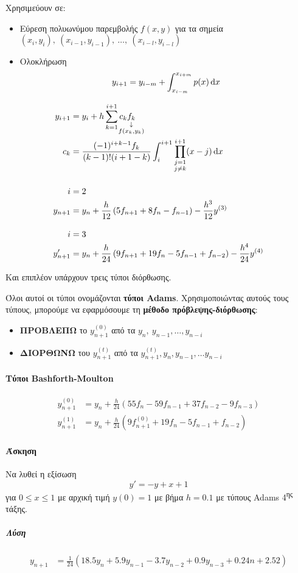 \documentclass[11pt,a4paper,notitlepage,fleqn,final]{article}
\begin{document}
Χρησιμεύουν σε:
\begin{itemize}
	\item Εύρεση πολυωνύμου παρεμβολής \(
	f(x,y)
	 \) για τα σημεία \( (x_i,y_i),\ (x_{i-1},y_{i-1}),\ \dots,\
	 (x_{i-l},y_{i-l})
	  \)
	\item Ολοκλήρωση
	\[
	y_{i+1} = y_{i-m} + \int_{x_{i-m}}^{x_{i+m}} p(x)\mathop{}\!\mathrm{d} x
	\]
\end{itemize}

\begin{align*}
	y_{i+1} &= y_i +h\sum_{k=1}^{i+1} c_k
	\underset{\substack{\downarrow\\ \mathclap{f(x_k,y_k)}}}{f_k} \\
	c_k &= \frac{(-1)^{i+k-1}f_k}{(k-1)!(i+1-k)}
	\int_{i}^{i+1} \prod_{\substack{j=1\\j\neq k}}^{i+1}
	(x-j)\dif x \\[3ex]
	i &= 2\\
	y_{n+1} &=
	y_n + \frac{h}{12}\left(5f_{n+1}+8f_n-f_{n-1}\right)
	-\frac{h^3}{12}y^{(3)} \\[2ex]
	i &= 3\\
	y_{n+1}' &= y_n+\frac{h}{24}\left(
	9f_{n+1}+19f_n-5f_{n-1}+f_{n-2}
	\right) -\frac{h^4}{24}y^{(4)}
\end{align*}

Και επιπλέον υπάρχουν τρεις τύποι διόρθωσης.

Όλοι αυτοί οι τύποι ονομάζονται \textbf{τύποι Adams}. Χρησιμοποιώντας
αυτούς τους τύπους, μπορούμε να εφαρμόσουμε τη \textbf{μέθοδο
πρόβλεψης-διόρθωσης}:
\begin{itemize}
	\item \textbf{ΠΡΟΒΛΕΠΩ}
	το \( y_{n+1}^{(0)} \) από τα \( y_n,\ y_{n-1},\dots,
	y_{n-i} \)
	\item \textbf{ΔΙΟΡΘΩΝΩ}
	του \( y_{n+1}^{(t)} \) από τα \( y_{n+1}^{(t)}, y_n,y_{n-1},\dots
	y_{n-i} \)
\end{itemize}

\paragraph{Τύποι Bashforth-Moulton}
\begin{align*}
	y_{n+1}^{(0)} &= y_n+\frac{h}{24} \left(
	55f_n-59f_{n-1}+37f_{n-2}-9f_{n-3}
	\right) \\
	y_{n+1}^{(1)} &= y_n + \frac{h}{24} \left(
	9f_{n+1}^{(0)}+19f_n-5f_{n-1}+f_{n-2}
	\right)
\end{align*}

\paragraph{Άσκηση}
Να λυθεί η εξίσωση
\[
y' = -y+x+1
\] για \( 0\leq x \leq 1 \) με αρχική τιμή \( y(0)=1 \) με βήμα
\( h=0.1 \) με τύπους Adams 4\textsuperscript{ης} τάξης.
\subparagraph{Λύση}
\begin{align*}
	y_{n+1} &= \frac{1}{24} (18.5y_n
	+5.9y_{n-1}-3.7y_{n-2}+0.9y_{n-3}+0.24n+2.52)
\end{align*}
\end{document}
